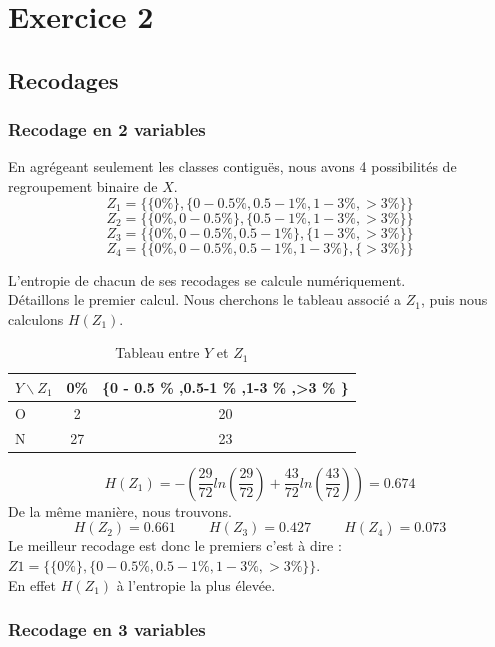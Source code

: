 \documentclass{article}
\begin{document}
\newpage
\section{Exercice 2}
\label{exercice2}
\subsection{Recodages}

\subsubsection{Recodage en 2 variables}

En agrégeant seulement les classes contiguës, nous avons 4 possibilités de regroupement binaire de 
$X$.
\\
 

\[
Z_1 =\{ \{0 \% \} , \{0 - 0.5 \% ,0.5-1 \% ,1-3 \% ,>3 \% \} \}  
\]
\[
Z_2 =\{ \{0 \% , 0 - 0.5 \%  \} , \{0.5-1 \% ,1-3 \% ,>3 \% \} \}
\]
\[
Z_3 =\{ \{0 \%, 0 - 0.5 \% ,0.5-1 \%  \} , \{1-3 \% ,>3 \% \} \}
\]
\[
Z_4 =\{ \{0 \% , 0 - 0.5 \% ,0.5-1 \% ,1-3 \% \} , \{>3 \% \} \}
\]


L'entropie de chacun de ses recodages se calcule numériquement.
\\
Détaillons le premier calcul. Nous cherchons le tableau associé a $Z_1$, puis nous calculons $H(Z_1)$.
\begin{table}[H]
  \centering
    \caption{Tableau entre $Y$ et $Z_1$}
    \begin{tabular}{|l|c|c|}
    \hline
    $Y \backslash Z_1$ & 0\% & \{0 - 0.5 \% ,0.5-1 \% ,1-3 \% ,>3 \% \} \\ \hline
    O                    & 2  & 20  \\ \hline
    N                    & 27  & 23  \\ \hline
    \end{tabular}
\end{table}
\[
H(Z_1) = -\left(\frac{29}{72}ln(\frac{29}{72})+\frac{43}{72}ln(\frac{43}{72})\right) = 0.674
\]
De la même manière, nous trouvons.
\[
H(Z_2) = 0.661 \hspace{1cm} H(Z_3) = 0.427 \hspace{1cm} H(Z_4) = 0.073
\]
Le meilleur recodage est donc le premiers c'est à dire :
$Z1 =\{ \{0 \% \} , \{0 - 0.5 \% ,0.5-1 \% ,1-3 \% ,>3 \% \} \}$.\\
En effet $H(Z_1)$ à l'entropie la plus élevée.


\subsubsection{Recodage en 3 variables}
\end{document}

